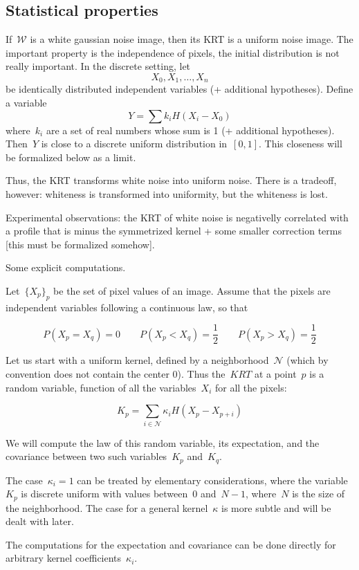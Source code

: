 \documentclass[12pt]{article}                  %
\begin{document}
\subsection{Statistical properties}

If~$\mathcal{W}$ is a white gaussian noise image, then its KRT is a uniform
noise image.  The important property is the independence of pixels, the
initial distribution is not really important.  In the discrete setting, let
\[
	X_0,X_1,\ldots,X_n
\]
be identically distributed independent variables (+ additional hypotheses).
Define a variable
\[
	Y = \sum k_i H(X_i-X_0)
\]
where~$k_i$ are a set of real numbers whose sum is 1 (+ additional
hypotheses).  Then~$Y$ is close to a discrete uniform distribution
in~$[0,1]$.  This closeness will be formalized below as a limit.

Thus, the KRT transforms white noise into uniform noise.  There is a
tradeoff, however: whiteness is transformed into uniformity, but the
whiteness is lost.

Experimental observations: the KRT of white noise is negativelly correlated
with a profile that is minus the symmetrized kernel + some smaller
correction terms [this must be formalized somehow].

\bigskip

Some explicit computations.

Let~$\{X_p\}_p$ be the set of pixel values of an image.  Assume that the
pixels are independent variables following a continuous law, so that

$$
P(X_p=X_q)=0
\qquad
P(X_p<X_q)=\frac12
\qquad
P(X_p>X_q)=\frac12
$$

Let us start with a uniform kernel, defined by a neighborhood~$\mathcal{N}$
(which by convention does not contain the center 0).
Thus the~$KRT$ at a point~$p$ is a random variable, function of all the
variables~$X_i$ for all the pixels:

\[
	K_p = \sum_{i\in\mathcal{N}} \kappa_i H(X_p - X_{p+i})
\]

We will compute the law of this random variable, its expectation, and the
covariance between two such variables~$K_p$ and~$K_q$.

The case~$\kappa_i=1$ can be treated by elementary considerations, where the
variable~$K_p$ is discrete uniform with values between~$0$ and~$N-1$,
where~$N$ is the size of the neighborhood.
The case for a general kernel~$\kappa$ is more subtle and will be dealt with
later.

The computations for the expectation and covariance can be done directly for
arbitrary kernel coefficients~$\kappa_i$.
\end{document}
